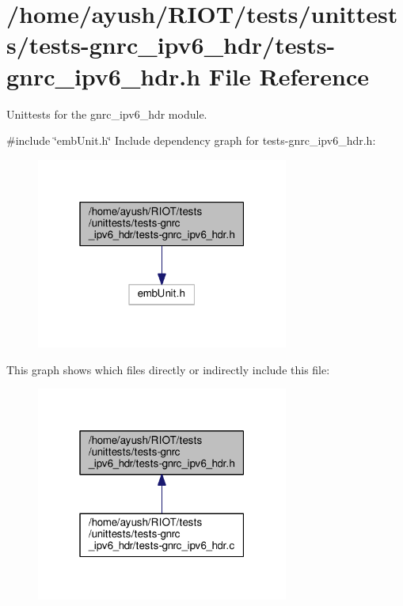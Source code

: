 \hypertarget{tests-gnrc__ipv6__hdr_8h}{}\section{/home/ayush/\+R\+I\+O\+T/tests/unittests/tests-\/gnrc\+\_\+ipv6\+\_\+hdr/tests-\/gnrc\+\_\+ipv6\+\_\+hdr.h File Reference}
\label{tests-gnrc__ipv6__hdr_8h}


Unittests for the {\ttfamily gnrc\+\_\+ipv6\+\_\+hdr} module.  


{\ttfamily \#include \char`\"{}emb\+Unit.\+h\char`\"{}}\newline
Include dependency graph for tests-\/gnrc\+\_\+ipv6\+\_\+hdr.h\+:
\nopagebreak
\begin{figure}[H]
\begin{center}
\leavevmode
\includegraphics[width=235pt]{tests-gnrc__ipv6__hdr_8h__incl}
\end{center}
\end{figure}
This graph shows which files directly or indirectly include this file\+:
\nopagebreak
\begin{figure}[H]
\begin{center}
\leavevmode
\includegraphics[width=235pt]{tests-gnrc__ipv6__hdr_8h__dep__incl}
\end{center}
\end{figure}
